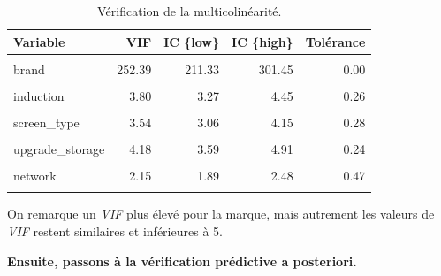 \documentclass[
  12pt,
]{report}
\begin{document}
\begin{table}[!h]
\centering
\caption{\label{tab:collinearity_log}Vérification de la multicolinéarité.}
\centering
\begin{tabular}[t]{lrrrr}
\toprule
\textbf{Variable} & \textbf{VIF} & \textbf{IC \{low\}} & \textbf{IC \{high\}} & \textbf{Tolérance}\\
\midrule
\cellcolor{gray!10}{storage} & \cellcolor{gray!10}{1.90} & \cellcolor{gray!10}{1.68} & \cellcolor{gray!10}{2.18} & \cellcolor{gray!10}{0.53}\\
brand & 252.39 & 211.33 & 301.45 & 0.00\\
\cellcolor{gray!10}{ram} & \cellcolor{gray!10}{3.68} & \cellcolor{gray!10}{3.17} & \cellcolor{gray!10}{4.31} & \cellcolor{gray!10}{0.27}\\
induction & 3.80 & 3.27 & 4.45 & 0.26\\
\cellcolor{gray!10}{screen\_size} & \cellcolor{gray!10}{1.62} & \cellcolor{gray!10}{1.45} & \cellcolor{gray!10}{1.86} & \cellcolor{gray!10}{0.62}\\
\addlinespace
screen\_type & 3.54 & 3.06 & 4.15 & 0.28\\
\cellcolor{gray!10}{made\_in} & \cellcolor{gray!10}{23.23} & \cellcolor{gray!10}{19.54} & \cellcolor{gray!10}{27.67} & \cellcolor{gray!10}{0.04}\\
upgrade\_storage & 4.18 & 3.59 & 4.91 & 0.24\\
\cellcolor{gray!10}{das\_limbs} & \cellcolor{gray!10}{2.06} & \cellcolor{gray!10}{1.81} & \cellcolor{gray!10}{2.37} & \cellcolor{gray!10}{0.49}\\
network & 2.15 & 1.89 & 2.48 & 0.47\\
\addlinespace
\cellcolor{gray!10}{ppi} & \cellcolor{gray!10}{2.89} & \cellcolor{gray!10}{2.51} & \cellcolor{gray!10}{3.37} & \cellcolor{gray!10}{0.35}\\
\bottomrule
\end{tabular}
\end{table}

\vspace{1em}

On remarque un \emph{VIF} plus élevé pour la marque, mais autrement les
valeurs de \emph{VIF} restent similaires et inférieures à 5.

\vspace{1em}

\textbf{Ensuite, passons à la vérification prédictive a posteriori.}

\vspace{1em}
\end{document}
